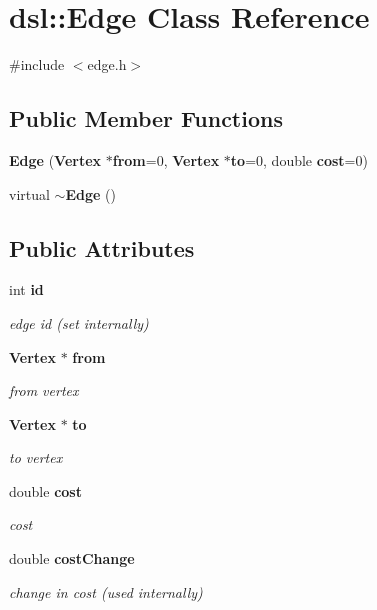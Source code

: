 \section{dsl\-:\-:\-Edge \-Class \-Reference}
\label{classdsl_1_1Edge}


{\ttfamily \#include $<$edge.\-h$>$}

\subsection*{\-Public \-Member \-Functions}
\begin{DoxyCompactItemize}
\item 
{\bf \-Edge} ({\bf \-Vertex} $\ast${\bf from}=0, {\bf \-Vertex} $\ast${\bf to}=0, double {\bf cost}=0)
\item 
virtual {\bf $\sim$\-Edge} ()
\end{DoxyCompactItemize}
\subsection*{\-Public \-Attributes}
\begin{DoxyCompactItemize}
\item 
int {\bf id}
\begin{DoxyCompactList}\small\item\em edge id (set internally) \end{DoxyCompactList}\item 
{\bf \-Vertex} $\ast$ {\bf from}
\begin{DoxyCompactList}\small\item\em from vertex \end{DoxyCompactList}\item 
{\bf \-Vertex} $\ast$ {\bf to}
\begin{DoxyCompactList}\small\item\em to vertex \end{DoxyCompactList}\item 
double {\bf cost}
\begin{DoxyCompactList}\small\item\em cost \end{DoxyCompactList}\item 
double {\bf cost\-Change}
\begin{DoxyCompactList}\small\item\em change in cost (used internally) \end{DoxyCompactList}\end{DoxyCompactItemize}
